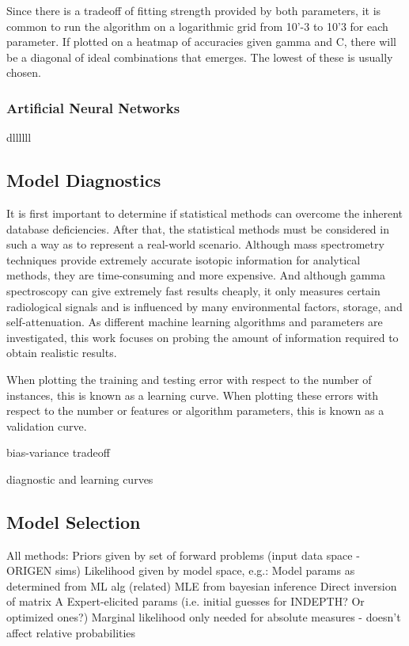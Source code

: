 Since there is a tradeoff of fitting strength provided by both parameters, it
is common to run the algorithm on a logarithmic grid from 10'-3 to 10'3 for
each parameter. If plotted on a heatmap of accuracies given gamma and C, there
will be a diagonal of ideal combinations that emerges. The lowest of these is
usually chosen. 


\subsubsection{Artificial Neural Networks}
\label{sec:neural}

dllllll


\subsection{Model Diagnostics}
\label{sec:diagnostics}

It is first important to determine if statistical methods can overcome the
inherent database deficiencies. After that, the statistical methods must be
considered in such a way as to represent a real-world scenario. Although mass
spectrometry techniques provide extremely accurate isotopic information for
analytical methods, they are time-consuming and more expensive. And although
gamma spectroscopy can give extremely fast results cheaply, it only measures
certain radiological signals and is influenced by many environmental factors,
storage, and self-attenuation. As different machine learning algorithms and
parameters are investigated, this work focuses on probing the amount of
information required to obtain realistic results.

When plotting the training and testing error
with respect to the number of instances, this is known as a learning curve.
When plotting these errors with respect to the number or features or algorithm
parameters, this is known as a validation curve. 

bias-variance tradeoff

diagnostic and learning curves

\subsection{Model Selection}
\label{sec:selection}


All methods:
Priors given by set of forward problems (input data space - ORIGEN sims)
Likelihood given by model space, e.g.: 
Model params as determined from ML alg
(related) MLE from bayesian inference
Direct inversion of matrix A
Expert-elicited params (i.e. initial guesses for INDEPTH? Or optimized ones?)
Marginal likelihood only needed for absolute measures - doesn’t affect relative probabilities
